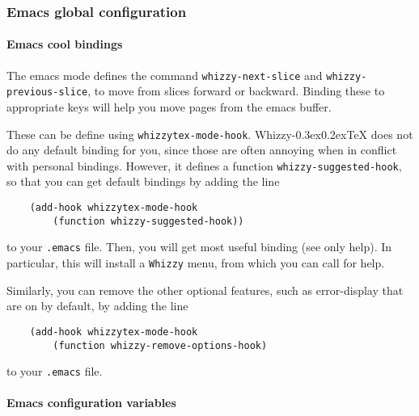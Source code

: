 \documentclass{article}
\makeatletter
\let \lst \verb
\def \whizzy {{Whizzy\kern -0.3ex\raise 0.2ex\hbox{\let \@\relax\TeX}}}
\makeatother
\begin{document}


\subsubsection {Emacs global configuration}

\label {emacs-configuration}

\paragraph {Emacs cool bindings}

The emacs mode defines the command \lst"whizzy-next-slice" and
\lst"whizzy-previous-slice", to move from slices forward or backward.
Binding these to appropriate keys will help you move pages from the emacs
buffer. 

These can be define using \lst"whizzytex-mode-hook". 
{\whizzy} does not do any default binding for you, since those are often
annoying when in conflict with personal bindings. 
However, it defines a function \lst"whizzy-suggested-hook", so that you can
get default bindings by adding the line
\begin{verbatim}
    (add-hook whizzytex-mode-hook 
        (function whizzy-suggested-hook))
\end{verbatim}
to your \lst".emacs" file. 
Then, you will get most useful binding (see only help). 
In particular, this will install a \lst"Whizzy" menu, from which you can
call for help.

Similarly, you can remove the other optional features, 
such as error-display that are on by default, by adding the line
\begin{verbatim}
    (add-hook whizzytex-mode-hook 
        (function whizzy-remove-options-hook)
\end{verbatim}
to your \lst".emacs" file.


\paragraph {Emacs configuration variables}
\end{document}
